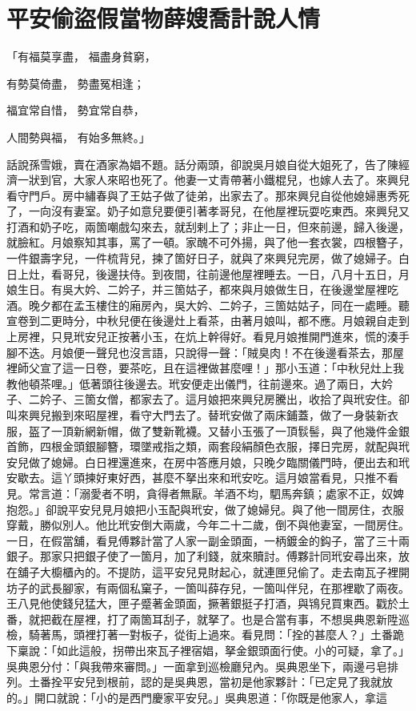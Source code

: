 %

\chapter{平安偷盜假當物\KG 薛嫂喬計說人情}

「有福莫享盡，  福盡身貧窮，

有勢莫倚盡，  勢盡冤相逢；

福宜常自惜，  勢宜常自恭，

人間勢與福，  有始多無終。」

話說孫雪娥，賣在酒家為娼不題。話分兩頭，卻說吳月娘自從大姐死了，告了陳經濟一狀到官，大家人來昭也死了。他妻一丈青帶著小鐵棍兒，也嫁人去了。來興兒看守門戶。房中繡春與了王姑子做了徒弟，出家去了。那來興兒自從他媳婦惠秀死了，一向沒有妻室。奶子如意兒要便引著孝哥兒，在他屋裡玩耍吃東西。來興兒又打酒和奶子吃，兩箇嘲戲勾來去，就刮剌上了；非止一日，但來前邊，歸入後邊，就臉紅。月娘察知其事，罵了一頓。家醜不可外揚，與了他一套衣裳，四根簪子，一件銀壽字兒，一件梳背兒，揀了箇好日子，就與了來興兒完房，做了媳婦子。白日上灶，看哥兒，後邊扶侍。到夜間，往前邊他屋裡睡去。一日，八月十五日，月娘生日。有吳大妗、二妗子，并三箇姑子，都來與月娘做生日，在後邊堂屋裡吃酒。晚夕都在孟玉樓住的廂房內，吳大妗、二妗子，三箇姑姑子，同在一處睡。聽宣卷到二更時分，中秋兒便在後邊灶上看茶，由著月娘叫，都不應。月娘親自走到上房裡，只見玳安兒正按著小玉，在炕上幹得好。看見月娘推開門進來，慌的湊手腳不迭。月娘便一聲兒也沒言語，只說得一聲：「賊臭肉！不在後邊看茶去，那屋裡師父宣了這一日卷，要茶吃，且在這裡做甚麼哩！」那小玉道：「中秋兒灶上我教他頓茶哩。」低著頭往後邊去。玳安便走出儀門，往前邊來。過了兩日，大妗子、二妗子、三箇女僧，都家去了。這月娘把來興兒房騰出，收拾了與玳安住。卻叫來興兒搬到來昭屋裡，看守大門去了。替玳安做了兩床鋪蓋，做了一身裝新衣服，盔了一頂新網新帽，做了雙新靴襪。又替小玉張了一頂䯼髻，與了他幾件金銀首飾，四根金頭銀腳簪，環墜戒指之類，兩套段絹顏色衣服，擇日完房，就配與玳安兒做了媳婦。白日裡還進來，在房中答應月娘，只晚夕臨關儀門時，便出去和玳安歇去。這丫頭揀好東好西，甚麼不拏出來和玳安吃。這月娘當看見，只推不看見。常言道：「溺愛者不明，貪得者無厭。羊酒不均，駟馬奔鎮；處家不正，奴婢抱怨。」卻說平安兒見月娘把小玉配與玳安，做了媳婦兒。與了他一間房住，衣服穿戴，勝似別人。他比玳安倒大兩歲，今年二十二歲，倒不與他妻室，一間房住。一日，在假當舖，看見傅夥計當了人家一副金頭面，一柄鍍金的鈎子，當了三十兩銀子。那家只把銀子使了一箇月，加了利錢，就來贖討。傅夥計同玳安尋出來，放在舖子大櫥櫃內的。不提防，這平安兒見財起心，就連匣兒偷了。走去南瓦子裡開坊子的武長腳家，有兩個私窠子，一箇叫薛存兒，一箇叫伴兒，在那裡歇了兩夜。王八見他使錢兒猛大，匣子蹙著金頭面，撅著銀挺子打酒，與鴇兒買東西。戳於土番，就把截在屋裡，打了兩箇耳刮子，就拏了。也是合當有事，不想吳典恩新陞巡檢，騎著馬，頭裡打著一對板子，從街上過來。看見問：「拴的甚麼人？」土番跪下稟說：「如此這般，拐帶出來瓦子裡宿娼，拏金銀頭面行使。小的可疑，拿了。」吳典恩分付：「與我帶來審問。」一面拿到巡檢廳兒內。吳典恩坐下，兩邊弓皂排列。土番拴平安兒到根前，認的是吳典恩，當初是他家夥計：「已定見了我就放的。」開口就說：「小的是西門慶家平安兒。」吳典恩道：「你既是他家人，拿這